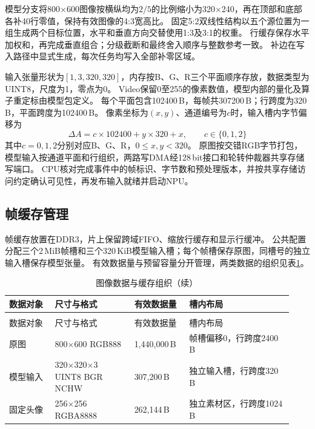 模型分支将800$\times$600图像按横纵均为$2/5$的比例缩小为320$\times$240，再在顶部和底部各补40行零值，保持有效图像的4:3宽高比。
固定5:2双线性结构以五个源位置为一组生成两个目标位置，水平和垂直方向交替使用1:3及3:1的权重。
行缓存保存水平加权和，再完成垂直组合；分级截断和最终舍入顺序与整数参考一致。
补边在写入路径中显式生成，每次任务均写入全部补零区域。

输入张量形状为$[1,3,320,320]$，内存按B、G、R三个平面顺序存放，数据类型为UINT8，尺度为1，零点为0。
Video保留0至255的像素数值，模型内部的量化及算子重定标由模型包定义。
每个平面包含102400\,B，每帧共307200\,B；行跨度为320\,B，平面跨度为102400\,B。
像素坐标为$(x,y)$、通道编号为$c$时，输入槽内字节偏移为
\[
\Delta A=c\times102400+y\times320+x,\qquad c\in\{0,1,2\}
\]
其中$c=0,1,2$分别对应B、G、R，$0\leq x,y<320$。
原图按交错RGB字节打包，模型输入按通道平面和行组织，两路写DMA经128\,bit接口和轮转仲裁器共享存储写端口。
CPU核对完成事件中的帧标识、字节数和预处理版本，并按共享存储访问约定确认可见性，再发布输入就绪并启动NPU。

\subsection{帧缓存管理}

帧缓存放置在DDR3，片上保留跨域FIFO、缩放行缓存和显示行缓冲。
公共配置分配三个2\,MiB帧槽和三个320\,KiB模型输入槽；每个帧槽保存原图，同槽号的独立输入槽保存模型张量。
有效数据量与预留容量分开管理，两类数据的组织见表\ref{tbl:video-frame-layout}。

\begin{reporttable}
\begin{longtable}{@{}p{0.15\linewidth}p{0.26\linewidth}p{0.18\linewidth}>{\raggedright\arraybackslash}p{0.34\linewidth}@{}}
\caption{图像数据与缓存组织}\label{tbl:video-frame-layout}\\
\toprule
数据对象 & 尺寸与格式 & 有效数据量 & 槽内布局 \\
\midrule
\endfirsthead
\caption[]{图像数据与缓存组织（续）}\\
\toprule
数据对象 & 尺寸与格式 & 有效数据量 & 槽内布局 \\
\midrule
\endhead
\bottomrule
\endfoot
原图 & 800$\times$600 RGB888 & 1,440,000\,B & 帧槽偏移0，行跨度2400\,B \\
模型输入 & 320$\times$320$\times$3 UINT8 BGR NCHW & 307,200\,B & 独立输入槽，行跨度320\,B \\
固定头像 & 256$\times$256 RGBA8888 & 262,144\,B & 独立素材区，行跨度1024\,B \\
\end{longtable}
\end{reporttable}

